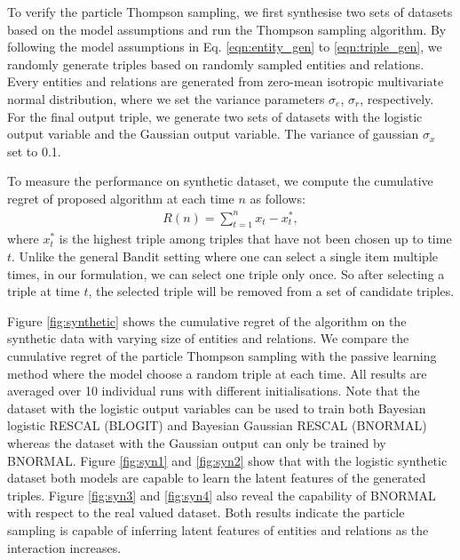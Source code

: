 To verify the particle Thompson sampling, we first synthesise two sets of datasets based on the model assumptions and run 
the Thompson sampling algorithm. By following the model assumptions in Eq. \ref{eqn:entity_gen} to 
\ref{eqn:triple_gen}, we randomly generate triples based on randomly sampled entities and relations. Every 
entities and relations are generated from zero-mean isotropic multivariate normal distribution, where we set 
the variance parameters $\sigma_e$, $\sigma_r$, respectively.
For the final output triple, we generate two sets of datasets with the logistic output variable and the Gaussian output variable. 
The variance of gaussian $\sigma_x$ set to 0.1.

To measure the performance on synthetic dataset, we compute the cumulative regret of proposed algorithm at 
each time $n$ as follows:
\begin{align}
R(n) = \sum_{t=1}^{n} x_t - x^{*}_t,
\end{align}
where $x^*_t$ is the highest triple among triples that have not been chosen up to time $t$. Unlike the general 
Bandit setting where one can select a single item multiple times, in our formulation, we can select one triple 
only once. So after selecting a triple at time $t$, the selected triple will be removed from a set of candidate 
triples.

Figure \ref{fig:synthetic} shows the cumulative regret of the algorithm on the synthetic data with varying size of 
entities and relations. We compare the cumulative regret of the particle Thompson sampling with the passive 
learning method where the model choose a random triple at each time. All results are averaged over 10 
individual runs with different initialisations. 
Note that the dataset with the logistic output variables can be used to train both Bayesian logistic RESCAL (BLOGIT) and Bayesian Gaussian RESCAL (BNORMAL) whereas the dataset with the Gaussian output can only be trained by BNORMAL.
Figure \ref{fig:syn1} and \ref{fig:syn2} show that with the logistic synthetic dataset both models are capable to learn the latent features of the generated triples. 
Figure \ref{fig:syn3} and \ref{fig:syn4} also reveal the capability of BNORMAL with respect to the real valued dataset.
Both results indicate the particle sampling is capable of inferring latent features 
of entities and relations as the interaction increases.


